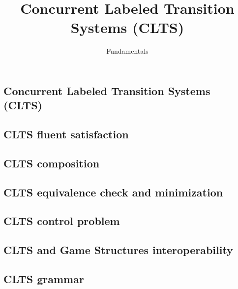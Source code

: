 \documentclass{article}
\title{Concurrent Labeled Transition Systems (CLTS)} %
\author{Fundamentals} %
\date{}
\begin{document}
\maketitle

\setcounter{section}{1} %
\setcounter{theorem}{1} %

\subsection{Concurrent Labeled Transition Systems (CLTS)}


\subsection{CLTS fluent satisfaction}


\subsection{CLTS composition}


\newpage
\subsection{CLTS equivalence check and minimization}


\newpage
\subsection{CLTS control problem}


\newpage
\subsection{CLTS and Game Structures interoperability}


\subsection{CLTS grammar}

\newpage


\end{document}
